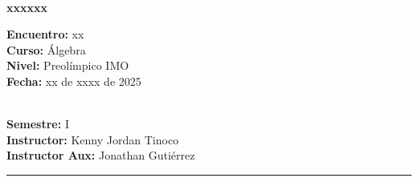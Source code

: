 \begin{center}
    \ \\
    \vspace{-4mm}
    \textbf{\Large xxxxxx}
\end{center}
\vspace{-5mm}
\begin{multicols}{2}
{
    \textbf{Encuentro:} xx\\
    \textbf{Curso:} Álgebra\\
    \textbf{Nivel:} Preolímpico IMO\\
    \textbf{Fecha:} xx de xxxx de 2025\\
    \begin{flushright}
        \ \\
        \textbf{Semestre:} I\\
        \textbf{Instructor:} Kenny Jordan Tinoco\\
        \textbf{Instructor Aux:} Jonathan Gutiérrez
    \end{flushright}
}
\end{multicols}
\vspace{-4mm}
\hrule
\tableofcontents

\thispagestyle{first-page-style}